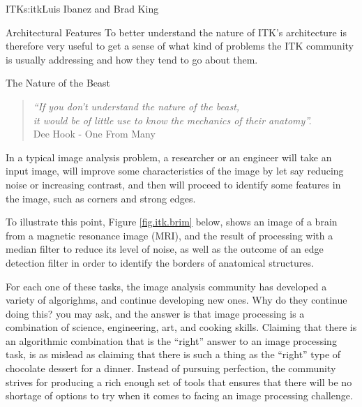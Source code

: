 \begin{aosachapter}{ITK}{s:itk}{Luis Ibanez and Brad King}
\begin{aosasect1}{Architectural Features}
To better understand the nature of ITK's architecture is therefore very useful
to get a sense of what kind of problems the ITK community is usually addressing
and how they tend to go about them.

\begin{aosasect2}{The Nature of the Beast}

\begin{center}
\begin{quotation}
\emph{
``If you don't understand the nature of the beast,\\
it would be of little use to know the mechanics of their anatomy''.\\
}
\hfill Dee Hook - One From Many
\end{quotation}
\end{center}

In a typical image analysis problem, a researcher or an engineer will take an
input image, will improve some characteristics of the image by let say reducing
noise or increasing contrast, and then will proceed to identify some features
in the image, such as corners and strong edges.

To illustrate this point, Figure \ref{fig.itk.brim} below, shows an image of a
brain from a magnetic resonance image (MRI), and the result of processing with
a median filter to reduce its level of noise, as well as the outcome of an edge
detection filter in order to identify the borders of anatomical structures.

%
%

For each one of these tasks, the image analysis community has developed a
variety of algorighms, and continue developing new ones. Why do they continue
doing this? you may ask, and the answer is that image processing is a
combination of science, engineering, art, and cooking skills. Claiming that
there is an algorithmic combination that is the ``right'' answer to an image
processing task, is as mislead as claiming that there is such a thing as the
``right'' type of chocolate dessert for a dinner. Instead of pursuing
perfection, the community strives for producing a rich enough set of tools that
ensures that there will be no shortage of options to try when it comes to
facing an image processing challenge.


\end{aosasect2}
\end{aosasect1}
\end{aosachapter}

